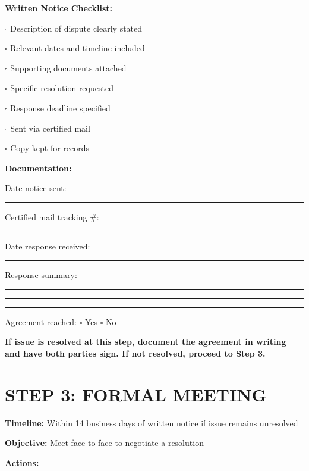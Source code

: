 \documentclass[11pt,letterpaper]{article}
\begin{document}
\vspace{6pt}

\textbf{Written Notice Checklist:}

$\square$ Description of dispute clearly stated

$\square$ Relevant dates and timeline included

$\square$ Supporting documents attached

$\square$ Specific resolution requested

$\square$ Response deadline specified

$\square$ Sent via certified mail

$\square$ Copy kept for records

\vspace{6pt}

\textbf{Documentation:}

Date notice sent: \rule{4cm}{0.4pt}

Certified mail tracking \#: \rule{5cm}{0.4pt}

Date response received: \rule{4cm}{0.4pt}

Response summary:

\rule{14cm}{0.4pt}

\rule{14cm}{0.4pt}

\rule{14cm}{0.4pt}

Agreement reached: $\square$ Yes $\square$ No

\vspace{6pt}

\textbf{If issue is resolved at this step, document the agreement in writing and have both parties sign. If not resolved, proceed to Step 3.}

\newpage

\section*{STEP 3: FORMAL MEETING}

\textbf{Timeline:} Within 14 business days of written notice if issue remains unresolved

\textbf{Objective:} Meet face-to-face to negotiate a resolution

\vspace{6pt}

\textbf{Actions:}
\end{document}
